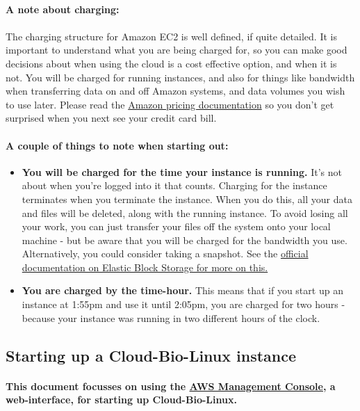\paragraph{A note about charging:} 
\paragraph{}The charging structure for Amazon EC2 is well defined, if quite detailed. It is important to understand what you are being charged for, so you can make good decisions about when using the cloud is a cost effective option, and when it is not. You will be charged for running instances, and also for things like bandwidth when transferring data on and off Amazon systems, and data volumes you wish to use later. Please read the \href{http://aws.amazon.com/ec2/pricing/}{Amazon pricing documentation} so you don't get surprised when you next see your credit card bill. 
\paragraph{A couple of things to note when starting out:}
\begin{itemize}
\item \textbf{You will be charged for the time your instance is running.} It's not about when you're logged into it that counts. Charging for the instance terminates when you terminate the instance. When you do this, all your data and files will be deleted, along with the running instance. To avoid losing all your work, you can just transfer your files off the system onto your local machine - but be aware that you will be charged for the bandwidth you use. Alternatively, you could consider taking a snapshot. See the \href{http://aws.amazon.com/ebs/}{official documentation on Elastic Block Storage for more on this.} 
\item \textbf{You are charged by the time-hour.} This means that if you start up an instance at 1:55pm and use it until 2:05pm, you are charged for two hours - because your instance was running in two different hours of the clock. 

\end{itemize}

\subsection{Starting up a Cloud-Bio-Linux instance}
\paragraph{This document focusses on using the \href{http://console.aws.amazon.com/ec2/home}{AWS Management Console}, a web-interface, for starting up Cloud-Bio-Linux.}

